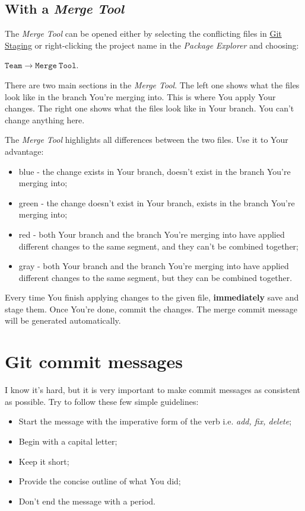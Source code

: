 \documentclass{article}
\begin{document}
\subsection{With a \textit{Merge Tool}}
The \textit{Merge Tool} can be opened either by selecting the conflicting files in \hyperref[sec:git_staging]{Git Staging} or right-clicking the project name in the \textit{Package Explorer} and choosing:\newline

$\mathtt{Team \rightarrow Merge\ Tool}$.\newline

There are two main sections in the \textit{Merge Tool}. The left one shows what the files look like in the branch You're merging into. This is where You apply Your changes. The right one shows what the files look like in Your branch. You can't change anything here.	

The \textit{Merge Tool} highlights all differences between the two files. Use it to Your advantage:
\begin{itemize}
	\item blue - the change exists in Your branch, doesn't exist in the branch You're merging into;
	\item green - the change doesn't exist in Your branch, exists in the branch You're merging into;
	\item red - both Your branch and the branch You're merging into have applied different changes to the same segment, and they can't be combined together;
	\item gray - both Your branch and the branch You're merging into have applied different changes to the same segment, but they can be combined together. 
\end{itemize}

Every time You finish applying changes to the given file, \textbf{immediately} save and stage them. Once You're done, commit the changes. The merge commit message will be generated automatically.

\section{Git commit messages}
\label{sec:commit_messages}
I know it's hard, but it is very important to make commit messages as consistent as possible. Try to follow these few simple guidelines: 
\begin{itemize}
    \item Start the message with the imperative form of the verb i.e. \textit{add, fix, delete};
    \item Begin with a capital letter; 
    \item Keep it short;
    \item Provide the concise outline of what You did;
    \item Don't end the message with a period. 
\end{itemize}
\end{document}
